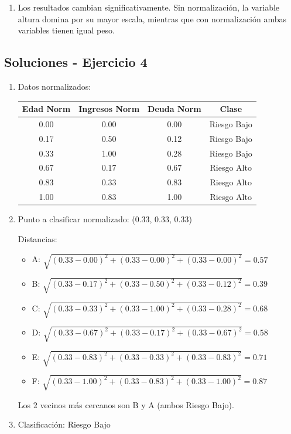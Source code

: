 \documentclass[12pt]{article}
\begin{document}
\begin{enumerate}
    \item Los resultados cambian significativamente. Sin normalización, la variable altura domina por su mayor escala, mientras que con normalización ambas variables tienen igual peso.
\end{enumerate}

\subsection{Soluciones - Ejercicio 4}

\begin{enumerate}
    \item Datos normalizados:
    \begin{table}[H]
        \centering
        \begin{tabular}{cccc}
            \toprule
            \textbf{Edad Norm} & \textbf{Ingresos Norm} & \textbf{Deuda Norm} & \textbf{Clase} \\
            \midrule
            0.00 & 0.00 & 0.00 & Riesgo Bajo \\
            0.17 & 0.50 & 0.12 & Riesgo Bajo \\
            0.33 & 1.00 & 0.28 & Riesgo Bajo \\
            0.67 & 0.17 & 0.67 & Riesgo Alto \\
            0.83 & 0.33 & 0.83 & Riesgo Alto \\
            1.00 & 0.83 & 1.00 & Riesgo Alto \\
            \bottomrule
        \end{tabular}
    \end{table}
    
    \item Punto a clasificar normalizado: (0.33, 0.33, 0.33)
    
    Distancias:
    \begin{itemize}
        \item A: $\sqrt{(0.33-0.00)^2 + (0.33-0.00)^2 + (0.33-0.00)^2} = 0.57$
        \item B: $\sqrt{(0.33-0.17)^2 + (0.33-0.50)^2 + (0.33-0.12)^2} = 0.39$
        \item C: $\sqrt{(0.33-0.33)^2 + (0.33-1.00)^2 + (0.33-0.28)^2} = 0.68$
        \item D: $\sqrt{(0.33-0.67)^2 + (0.33-0.17)^2 + (0.33-0.67)^2} = 0.58$
        \item E: $\sqrt{(0.33-0.83)^2 + (0.33-0.33)^2 + (0.33-0.83)^2} = 0.71$
        \item F: $\sqrt{(0.33-1.00)^2 + (0.33-0.83)^2 + (0.33-1.00)^2} = 0.87$
    \end{itemize}
    
    Los 2 vecinos más cercanos son B y A (ambos Riesgo Bajo).
    
    \item Clasificación: Riesgo Bajo
\end{enumerate}
\end{document}
